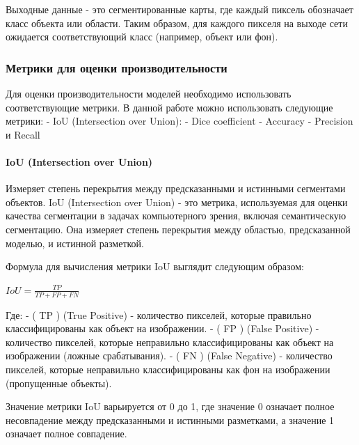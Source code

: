 \documentclass[11pt]{article}
\begin{document}
Выходные данные - это сегментированные карты, где каждый пиксель
обозначает класс объекта или области. Таким образом, для каждого пикселя
на выходе сети ожидается соответствующий класс (например, объект или
фон).

\hypertarget{ux43cux435ux442ux440ux438ux43aux438-ux434ux43bux44f-ux43eux446ux435ux43dux43aux438-ux43fux440ux43eux438ux437ux432ux43eux434ux438ux442ux435ux43bux44cux43dux43eux441ux442ux438}{%
\subsubsection{Метрики для оценки
производительности}\label{ux43cux435ux442ux440ux438ux43aux438-ux434ux43bux44f-ux43eux446ux435ux43dux43aux438-ux43fux440ux43eux438ux437ux432ux43eux434ux438ux442ux435ux43bux44cux43dux43eux441ux442ux438}}

Для оценки производительности моделей необходимо использовать
соответствующие метрики. В данной работе можно использовать следующие
метрики: - IoU (Intersection over Union): - Dice coefficient - Accuracy
- Precision и Recall

    \hypertarget{iou-intersection-over-union}{%
\paragraph{IoU (Intersection over
Union)}\label{iou-intersection-over-union}}

Измеряет степень перекрытия между предсказанными и истинными сегментами
объектов. IoU (Intersection over Union) - это метрика, используемая для
оценки качества сегментации в задачах компьютерного зрения, включая
семантическую сегментацию. Она измеряет степень перекрытия между
областью, предсказанной моделью, и истинной разметкой.

Формула для вычисления метрики IoU выглядит следующим образом:

\(IoU = \frac{TP}{TP + FP + FN}\)

Где: - ( TP ) (True Positive) - количество пикселей, которые правильно
классифицированы как объект на изображении. - ( FP ) (False Positive) -
количество пикселей, которые неправильно классифицированы как объект на
изображении (ложные срабатывания). - ( FN ) (False Negative) -
количество пикселей, которые неправильно классифицированы как фон на
изображении (пропущенные объекты).

Значение метрики IoU варьируется от 0 до 1, где значение 0 означает
полное несовпадение между предсказанными и истинными разметками, а
значение 1 означает полное совпадение.
\end{document}
